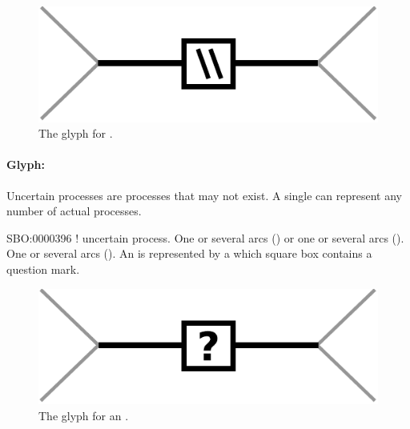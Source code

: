 \begin{figure}[H]
  \centering
  \includegraphics[scale = 0.5]{images/omitted}
  \caption{The \PD glyph for .}
  \label{fig:omitted}
\end{figure}



\paragraph{Glyph: }\label{sec:uncertain}

Uncertain processes are processes that may not exist. A single  can represent any number of actual processes.

\begin{glyphDescription}
 \glyphSboTerm SBO:0000396 ! uncertain process.
 \glyphOrigin One or several  arcs () or one or several  arcs ().
 \glyphTarget One or several  arcs ().
 \glyphNode An  is represented by a  which square box contains a question mark.
 \end{glyphDescription}

\begin{figure}[H]
  \centering
  \includegraphics[scale = 0.5]{images/uncertain}
  \caption{The \PD glyph for an .}
  \label{fig:uncertain}
\end{figure}


